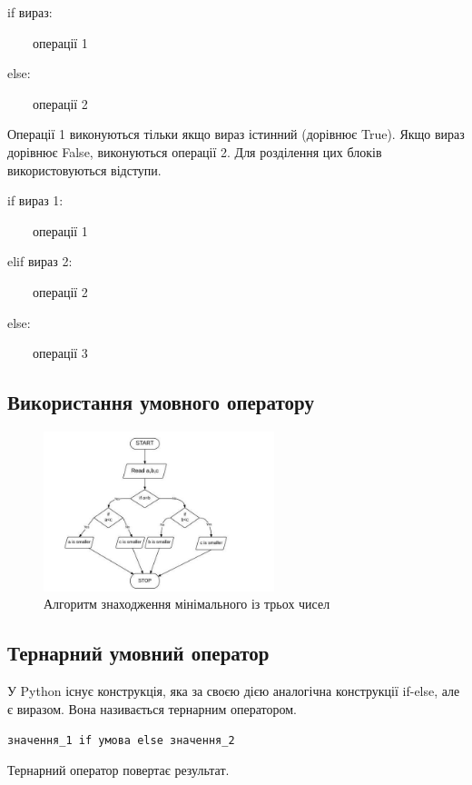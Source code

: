 \begin{frame}
\huge{if вираз:

~~~~операції 1

else:

~~~~операції 2}


\begin{flushleft}
\normalsize
Операції 1 виконуються тільки якщо вираз істинний (дорівнює True). Якщо вираз дорівнює False, виконуються операції 2. Для розділення цих блоків використовуються відступи.
\end{flushleft}
\end{frame}


\begin{frame}
\huge{if вираз 1:

~~~~операції 1

elif вираз 2:

~~~~операції 2

else:

~~~~операції 3}

\end{frame}

 \subsection{Використання умовного оператору} 
\begin{frame}
\begin{figure}
\begin{center}
 \includegraphics[width=0.6\textwidth]{pictures/find_min.jpg}
\caption{Алгоритм знаходження мінімального із трьох чисел}
\label{find_min} 
\end{center}
\end{figure}
\end{frame}

 \subsection{Тернарний умовний оператор} 
\begin{frame}
У Python існує конструкція, яка за своєю дією аналогічна конструкції if-else, але є виразом. Вона називається тернарним оператором.

\Large{\texttt{значення\_1 if умова else значення\_2}}

Тернарний оператор повертає результат.
\end{frame}

